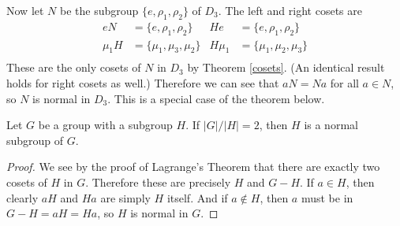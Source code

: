 \begin{example}
\label{normal_d3}
Now let $N$ be the subgroup $\{e, \rho_1, \rho_2\}$ of $D_3$. The left and right cosets are
\begin{align*}
    eN      &= \{e, \rho_1, \rho_2\}   & He &= \{e, \rho_1, \rho_2\} \\
    \mu_1 H &= \{\mu_1, \mu_3, \mu_2\} & H \mu_1 &= \{\mu_1, \mu_2, \mu_3\} \\
\end{align*}
These are the only cosets of $N$ in $D_3$ by Theorem \ref{cosets}. (An identical result holds for right cosets as well.) Therefore we can see that $aN = Na$ for all $a \in N$, so $N$ is normal in $D_3$. This is a special case of the theorem below.
\end{example}

\begin{theorem}
Let \extra $G$ be a group with a subgroup $H$. If $|G|/|H| = 2$, then $H$ is a normal subgroup of $G$.
\end{theorem}

\begin{proof}
We see by the proof of Lagrange's Theorem that there are exactly two cosets of $H$ in $G$. Therefore these are precisely $H$ and $G - H$. If $a \in H$, then clearly $aH$ and $Ha$ are simply $H$ itself. And if $a \notin H$, then $a$ must be in $G-H = aH = Ha$, so $H$ is normal in $G$. 
\end{proof}